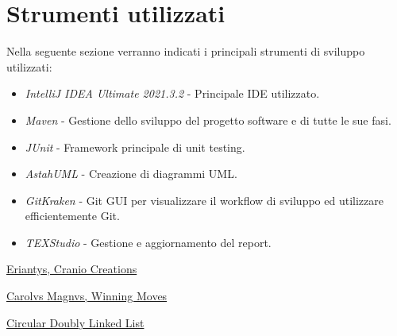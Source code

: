 \documentclass[a4paper, 12pt]{article}
\begin{document}
	\section{Strumenti utilizzati}
	Nella seguente sezione verranno indicati i principali strumenti di sviluppo utilizzati:\\
	\begin{itemize}
		\setlength{\parskip}{0pt}
		\setlength{\parsep}{0pt}
		
		\item \emph{IntelliJ IDEA Ultimate 2021.3.2} - Principale IDE utilizzato.
		\item \emph{Maven} - Gestione dello sviluppo del progetto software e di tutte le sue fasi.
		\item \emph{JUnit} - Framework principale di unit testing.
		\item \emph{AstahUML} - Creazione di diagrammi UML.
		\item \emph{GitKraken} - Git GUI per visualizzare il workflow di sviluppo ed utilizzare efficientemente Git.
		\item \emph{TEXStudio} - Gestione e aggiornamento del report.
	\end{itemize}
	\newpage
	\begin{thebibliography}{99}
		\href{https://www.craniocreations.it/prodotto/eriantys/}{Eriantys, Cranio Creations}
		
		\href{https://www.goblins.net/giochi/carolus-magnus-5071}{Carolvs Magnvs, Winning Moves}
		
		\href{https://www.softwaretestinghelp.com/doubly-linked-list-in-java/#Circular_Doubly_Linked_List_In_Java}{Circular Doubly Linked List}
		
	\end{thebibliography} 
\end{document}
